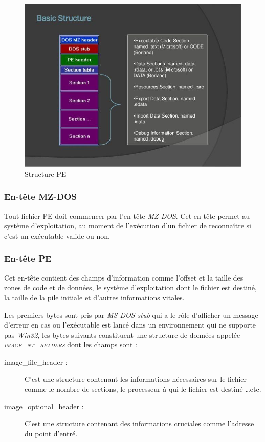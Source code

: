\begin{figure}[h]
    \centering
    \includegraphics[scale=0.5]{images/pe_header.jpg}
    \caption{Structure PE}
    \label{structure_pe}
\end{figure}

    \subsubsection{En-tête MZ-DOS}
    Tout fichier PE doit commencer par l'en-tête \emph{MZ-DOS}. Cet en-tête permet au système d'exploitation, au 
    moment de l'exécution d'un fichier de reconnaître si c'est un exécutable valide ou non. \cite{pe2} %

    \subsubsection{En-tête PE}
    Cet en-tête contient des champs d'information comme l'offset et la taille des zones de code et de données, 
    le système d'exploitation dont le fichier est destiné, la taille de la pile initiale et 
    d'autres informations vitales. \cite{pe3} %

    Les premiers bytes sont pris par \emph{MS-DOS stub} qui a le rôle d'afficher un message d'erreur en cas ou 
    l'exécutable est lancé dans un environnement qui ne supporte pas \emph{Win32}, les bytes suivants constituent 
    une structure de données appelée \emph{\textsc{image\_nt\_headers}} dont les champs sont : %
    \begin{description}
        \item[image\_file\_header :] C'est une structure contenant les informations nécessaires
            sur le fichier comme le nombre de sections, le processeur à qui le fichier est destiné \ldots etc. %
        \item[image\_optional\_header :] C'est une structure contenant des informations cruciales comme l'adresse
            du point d'entré. %
    \end{description}

